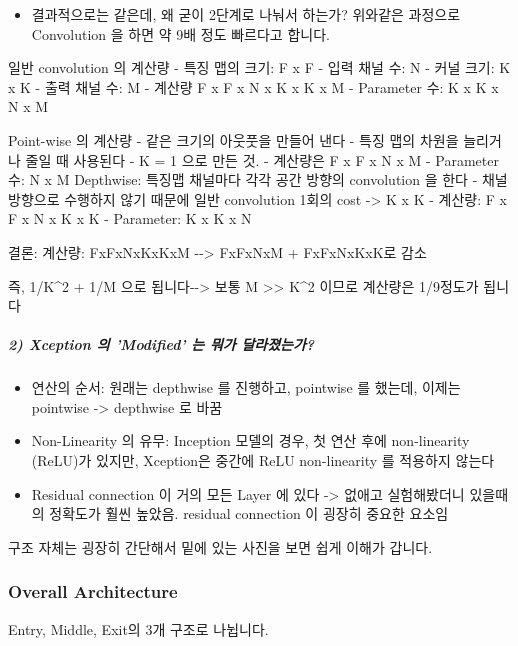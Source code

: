 \documentclass[11pt]{article}
\providecommand{\tightlist}{%
      \setlength{\itemsep}{0pt}\setlength{\parskip}{0pt}}
\begin{document}
\begin{itemize}
\tightlist
\item
  결과적으로는 같은데, 왜 굳이 2단계로 나눠서 하는가? 위와같은 과정으로
  Convolution 을 하면 약 9배 정도 빠르다고 합니다.
\end{itemize}

일반 convolution 의 계산량 - 특징 맵의 크기: F x F - 입력 채널 수: N -
커널 크기: K x K - 출력 채널 수: M - 계산량 F x F x N x K x K x M -
Parameter 수: K x K x N x M

Point-wise 의 계산량 - 같은 크기의 아웃풋을 만들어 낸다 - 특징 맵의
차원을 늘리거나 줄일 때 사용된다 - K = 1 으로 만든 것. - 계산량은 F x F
x N x M - Parameter 수: N x M Depthwise: 특징맵 채널마다 각각 공간
방향의 convolution 을 한다 - 채널방향으로 수행하지 않기 때문에 일반
convolution 1회의 cost -\textgreater{} K x K - 계산량: F x F x N x K x K
- Parameter: K x K x N

결론: 계산량: FxFxNxKxKxM -\/-\textgreater{} FxFxNxM + FxFxNxKxK로 감소

즉, 1/K\^{}2 + 1/M 으로 됩니다-\/-\textgreater{} 보통 M
\textgreater{}\textgreater{} K\^{}2 이므로 계산량은 1/9정도가 됩니다

\subparagraph{2) Xception 의 'Modified' 는 뭐가
달라졌는가?}\label{xception-uxc758-modified-uxb294-uxbb50uxac00-uxb2ecuxb77cuxc84cuxb294uxac00}

\begin{itemize}
\item
  연산의 순서: 원래는 depthwise 를 진행하고, pointwise 를 했는데, 이제는
  pointwise -\textgreater{} depthwise 로 바꿈
\item
  Non-Linearity 의 유무: Inception 모델의 경우, 첫 연산 후에
  non-linearity (ReLU)가 있지만, Xception은 중간에 ReLU non-linearity 를
  적용하지 않는다
\item
  Residual connection 이 거의 모든 Layer 에 있다 -\textgreater{} 없애고
  실험해봤더니 있을때의 정확도가 훨씬 높았음. residual connection 이
  굉장히 중요한 요소임
\end{itemize}

구조 자체는 굉장히 간단해서 밑에 있는 사진을 보면 쉽게 이해가 갑니다.

    \subsubsection{Overall Architecture}\label{overall-architecture}

Entry, Middle, Exit의 3개 구조로 나뉩니다.
\end{document}
